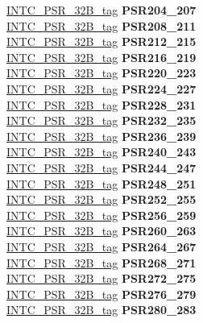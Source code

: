 \begin{DoxyCompactItemize}
\begin{tabbing}
\>\>\mbox{\hyperlink{unionINTC__PSR__32B__tag}{INTC\_PSR\_32B\_tag}} {\bfseries PSR204\_207}\\
\>\>\mbox{\hyperlink{unionINTC__PSR__32B__tag}{INTC\_PSR\_32B\_tag}} {\bfseries PSR208\_211}\\
\>\>\mbox{\hyperlink{unionINTC__PSR__32B__tag}{INTC\_PSR\_32B\_tag}} {\bfseries PSR212\_215}\\
\>\>\mbox{\hyperlink{unionINTC__PSR__32B__tag}{INTC\_PSR\_32B\_tag}} {\bfseries PSR216\_219}\\
\>\>\mbox{\hyperlink{unionINTC__PSR__32B__tag}{INTC\_PSR\_32B\_tag}} {\bfseries PSR220\_223}\\
\>\>\mbox{\hyperlink{unionINTC__PSR__32B__tag}{INTC\_PSR\_32B\_tag}} {\bfseries PSR224\_227}\\
\>\>\mbox{\hyperlink{unionINTC__PSR__32B__tag}{INTC\_PSR\_32B\_tag}} {\bfseries PSR228\_231}\\
\>\>\mbox{\hyperlink{unionINTC__PSR__32B__tag}{INTC\_PSR\_32B\_tag}} {\bfseries PSR232\_235}\\
\>\>\mbox{\hyperlink{unionINTC__PSR__32B__tag}{INTC\_PSR\_32B\_tag}} {\bfseries PSR236\_239}\\
\>\>\mbox{\hyperlink{unionINTC__PSR__32B__tag}{INTC\_PSR\_32B\_tag}} {\bfseries PSR240\_243}\\
\>\>\mbox{\hyperlink{unionINTC__PSR__32B__tag}{INTC\_PSR\_32B\_tag}} {\bfseries PSR244\_247}\\
\>\>\mbox{\hyperlink{unionINTC__PSR__32B__tag}{INTC\_PSR\_32B\_tag}} {\bfseries PSR248\_251}\\
\>\>\mbox{\hyperlink{unionINTC__PSR__32B__tag}{INTC\_PSR\_32B\_tag}} {\bfseries PSR252\_255}\\
\>\>\mbox{\hyperlink{unionINTC__PSR__32B__tag}{INTC\_PSR\_32B\_tag}} {\bfseries PSR256\_259}\\
\>\>\mbox{\hyperlink{unionINTC__PSR__32B__tag}{INTC\_PSR\_32B\_tag}} {\bfseries PSR260\_263}\\
\>\>\mbox{\hyperlink{unionINTC__PSR__32B__tag}{INTC\_PSR\_32B\_tag}} {\bfseries PSR264\_267}\\
\>\>\mbox{\hyperlink{unionINTC__PSR__32B__tag}{INTC\_PSR\_32B\_tag}} {\bfseries PSR268\_271}\\
\>\>\mbox{\hyperlink{unionINTC__PSR__32B__tag}{INTC\_PSR\_32B\_tag}} {\bfseries PSR272\_275}\\
\>\>\mbox{\hyperlink{unionINTC__PSR__32B__tag}{INTC\_PSR\_32B\_tag}} {\bfseries PSR276\_279}\\
\>\>\mbox{\hyperlink{unionINTC__PSR__32B__tag}{INTC\_PSR\_32B\_tag}} {\bfseries PSR280\_283}\\

\end{tabbing}
\end{DoxyCompactItemize}
